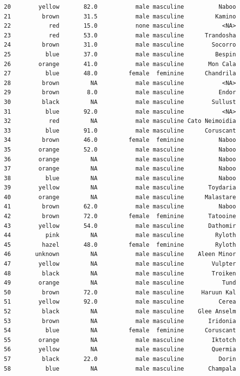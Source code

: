 \documentclass[
]{article}
\begin{document}
\begin{verbatim}
20        yellow       82.0           male masculine          Naboo
21         brown       31.5           male masculine         Kamino
22           red       15.0           none masculine           <NA>
23           red       53.0           male masculine      Trandosha
24         brown       31.0           male masculine        Socorro
25          blue       37.0           male masculine         Bespin
26        orange       41.0           male masculine       Mon Cala
27          blue       48.0         female  feminine      Chandrila
28         brown         NA           male masculine           <NA>
29         brown        8.0           male masculine          Endor
30         black         NA           male masculine        Sullust
31          blue       92.0           male masculine           <NA>
32           red         NA           male masculine Cato Neimoidia
33          blue       91.0           male masculine      Coruscant
34         brown       46.0         female  feminine          Naboo
35        orange       52.0           male masculine          Naboo
36        orange         NA           male masculine          Naboo
37        orange         NA           male masculine          Naboo
38          blue         NA           male masculine          Naboo
39        yellow         NA           male masculine       Toydaria
40        orange         NA           male masculine      Malastare
41         brown       62.0           male masculine          Naboo
42         brown       72.0         female  feminine       Tatooine
43        yellow       54.0           male masculine       Dathomir
44          pink         NA           male masculine         Ryloth
45         hazel       48.0         female  feminine         Ryloth
46       unknown         NA           male masculine    Aleen Minor
47        yellow         NA           male masculine        Vulpter
48         black         NA           male masculine        Troiken
49        orange         NA           male masculine           Tund
50         brown       72.0           male masculine     Haruun Kal
51        yellow       92.0           male masculine          Cerea
52         black         NA           male masculine    Glee Anselm
53         brown         NA           male masculine       Iridonia
54          blue         NA         female  feminine      Coruscant
55        orange         NA           male masculine        Iktotch
56        yellow         NA           male masculine        Quermia
57         black       22.0           male masculine          Dorin
58          blue         NA           male masculine       Champala

\end{verbatim}
\end{document}

